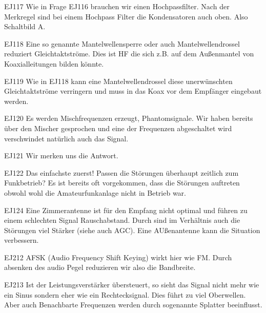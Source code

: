 \documentclass[10pt,a4paper,ngerman]{article}
\theoremstyle{definition}
\theoremstyle{plain}
\theoremstyle{mytheorem}
\theoremstyle{definition}
\begin{document}
\begin{sol}{EJ117}
Wie in Frage EJ116 brauchen wir einen Hochpassfilter. Nach der Merkregel sind bei einem Hochpass Filter die Kondensatoren auch oben. Also Schaltbild A.
\end{sol}

\begin{sol}{EJ118}
Eine so genannte Mantelwellensperre oder auch Mantelwellendrossel reduziert Gleichtaktströme. Dies ist HF die sich z.B. auf dem Außenmantel von Koaxialleitungen bilden könnte.
\end{sol}

\begin{sol}{EJ119}
Wie in EJ118 kann eine Mantelwellendrossel diese unerwünschten Gleichtaktströme verringern und muss in das Koax vor dem Empfänger eingebaut werden.
\end{sol}


\begin{sol}{EJ120}
Es werden Mischfrequenzen erzeugt, Phantomsignale. Wir haben bereits über den Mischer gesprochen und eine der Frequenzen abgeschaltet wird verschwindet natürlich auch das Signal.
\end{sol}

\begin{sol}{EJ121}
Wir merken uns die Antwort.
\end{sol}

\begin{sol}{EJ122}
Das einfachste zuerst! Passen die Störungen überhaupt zeitlich zum Funkbetrieb?
Es ist bereits oft vorgekommen, dass die Störungen auftreten obwohl wohl die Amateurfunkanlage nicht in Betrieb war.
\end{sol}

\begin{sol}{EJ124}
Eine Zimmerantenne ist für den Empfang nicht optimal und führen zu einem schlechten Signal Rauschabstand. Durch sind im Verhältnis auch die Störungen viel Stärker (siehe auch AGC). Eine AUßenantenne kann die Situation verbessern.
\end{sol}

\begin{sol}{EJ212}
AFSK (Audio Frequency Shift Keying) wirkt hier wie FM. Durch absenken des audio Pegel reduzieren wir also die Bandbreite.
\end{sol}

\begin{sol}{EJ213}
Ist der Leistungsverstärker übersteuert, so sieht das Signal nicht mehr wie ein Sinus sondern eher wie ein Rechtecksignal. Dies führt zu viel Oberwellen. Aber auch Benachbarte Frequenzen werden durch sogenannte Splatter beeinflusst.
\end{sol}
\end{document}
